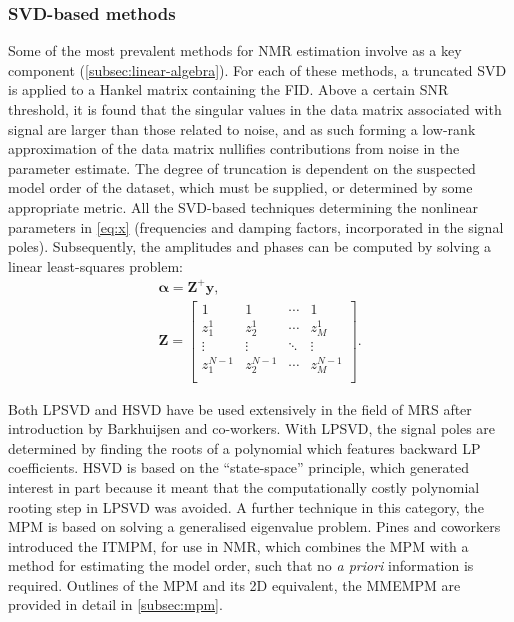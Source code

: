 \subsubsection{\acs{SVD}-based methods}
Some of the most prevalent methods for \ac{NMR} estimation involve 
as a key component (\cref{subsec:linear-algebra}). For each of these methods,
a truncated \ac{SVD} is applied to a Hankel matrix containing the \ac{FID}.
Above a certain \ac{SNR} threshold, it is found that the singular values in the data matrix associated with signal are
larger than those related to noise, and as such forming a low-rank
approximation of the data matrix nullifies contributions from noise in the
parameter estimate.
The degree of truncation is dependent on the suspected model order of the
dataset, which must be supplied, or determined by some appropriate metric.
All the \ac{SVD}-based techniques determining the nonlinear
parameters in \cref{eq:x} (frequencies and damping factors, incorporated in
the signal poles).
Subsequently, the amplitudes and phases can be computed by solving a
linear least-squares problem:
\begin{subequations}
    \begin{gather}
        \symbf{\alpha} = \symbf{Z}^+ \symbf{y},\\
        \symbf{Z} = \begin{bmatrix}
            1 & 1 & \cdots & 1 \\
            z_1^1 & z_2^1 & \cdots & z_M^1\\
            \vdots & \vdots & \ddots & \vdots\\
            z_1^{N-1} & z_2^{N-1} & \cdots & z_M^{N-1}\\
            \end{bmatrix}.
    \end{gather}
    \label{eq:complex-amplitudes}
\end{subequations}

Both \ac{LPSVD}\cite{Kumaresan1982,Kumaresan1983} and
\ac{HSVD}\cite{Kung1983} have be used extensively in the field of \ac{MRS}
after introduction by Barkhuijsen and
co-workers\cite{Barkhuijsen1985a,Barkhuijsen1985b,Barkhuijsen1987,Beer1988,Pijnappel1992}.
With
\ac{LPSVD}, the signal poles are determined by finding the roots of a
polynomial which features backward \ac{LP} coefficients. \ac{HSVD} is
based on the ``state-space'' principle, which generated interest in part
because it meant that the computationally costly polynomial rooting step in
\ac{LPSVD} was avoided.
A further technique in this category, the
\ac{MPM}\cite{Hua1990,Hua1990b,Hua1991} is based on solving a generalised
eigenvalue problem.  Pines and coworkers introduced the \ac{ITMPM}\cite{Lin1997},
for use in \ac{NMR}, which combines the \ac{MPM} with a method for estimating
the model order, such that no \textit{a priori} information is required.
Outlines of the \ac{MPM} and its \ac{2D} equivalent, the
\ac{MMEMPM}\cite{Hua1992,Chen2007} are provided in detail in
\cref{subsec:mpm}.

